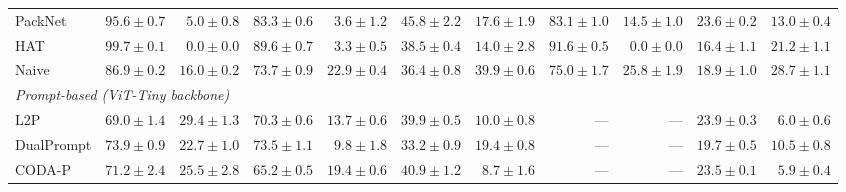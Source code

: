\begin{table}[t]
\begin{tabular}{lrrrrrrrrrr}
PackNet & $95.6 \pm 0.7$ & $5.0 \pm 0.8$ & $83.3 \pm 0.6$ & $3.6 \pm 1.2$ & $45.8 \pm 2.2$ & $17.6 \pm 1.9$ & $83.1 \pm 1.0$ & $14.5 \pm 1.0$ & $23.6 \pm 0.2$ & $13.0 \pm 0.4$ \\
HAT & $99.7 \pm 0.1$ & $0.0 \pm 0.0$ & $89.6 \pm 0.7$ & $3.3 \pm 0.5$ & $38.5 \pm 0.4$ & $14.0 \pm 2.8$ & $91.6 \pm 0.5$ & $0.0 \pm 0.0$ & $16.4 \pm 1.1$ & $21.2 \pm 1.1$ \\
Naive & $86.9 \pm 0.2$ & $16.0 \pm 0.2$ & $73.7 \pm 0.9$ & $22.9 \pm 0.4$ & $36.4 \pm 0.8$ & $39.9 \pm 0.6$ & $75.0 \pm 1.7$ & $25.8 \pm 1.9$ & $18.9 \pm 1.0$ & $28.7 \pm 1.1$ \\
\midrule
\multicolumn{11}{l}{\textit{Prompt-based (ViT-Tiny backbone)}} \\
L2P & $69.0 \pm 1.4$ & $29.4 \pm 1.3$ & $70.3 \pm 0.6$ & $13.7 \pm 0.6$ & $39.9 \pm 0.5$ & $10.0 \pm 0.8$ & --- & --- & $23.9 \pm 0.3$ & $6.0 \pm 0.6$ \\
DualPrompt & $73.9 \pm 0.9$ & $22.7 \pm 1.0$ & $73.5 \pm 1.1$ & $9.8 \pm 1.8$ & $33.2 \pm 0.9$ & $19.4 \pm 0.8$ & --- & --- & $19.7 \pm 0.5$ & $10.5 \pm 0.8$ \\
CODA-P & $71.2 \pm 2.4$ & $25.5 \pm 2.8$ & $65.2 \pm 0.5$ & $19.4 \pm 0.6$ & $40.9 \pm 1.2$ & $8.7 \pm 1.6$ & --- & --- & $23.5 \pm 0.1$ & $5.9 \pm 0.4$ \\
\bottomrule
\end{tabular}
\end{table}
